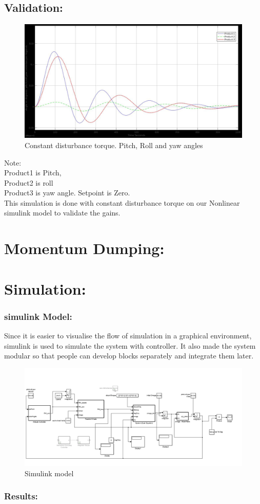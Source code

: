 \documentclass[10pt,a4paper]{report}
\begin{document}
\section{Validation:}
\begin{figure}[H]
	\centering
	\includegraphics[width=1.0\linewidth]{simulation_at_constantTOrq_pryangles}
	\caption{Constant disturbance torque. Pitch, Roll and yaw angles}
	\label{Constant disturbance torque. Pitch, Roll and yaw angles}
\end{figure}
	Note: \\Product1 is Pitch, \\Product2 is roll \\ Product3 is yaw angle.
	Setpoint is Zero. \\
This simulation is done with constant disturbance torque on our Nonlinear simulink model to validate the gains.
\chapter{Momentum Dumping:}
\chapter{Simulation:}
\subsection{simulink Model:}
Since it is easier to visualise the flow of simulation in a graphical environment, simulink is used to simulate the system with controller.
It also made the system modular so that people can develop blocks separately and integrate them later.
\begin{figure}[H]
\centering
\includegraphics[scale=0.3]{Untitled1.png}
\caption{Simulink model}
\end{figure}
\subsection{Results:}
\end{document}
